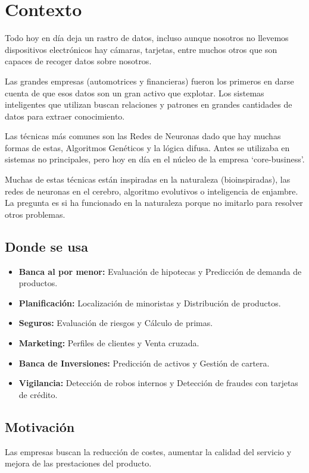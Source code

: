 \documentclass[12pt, twoside, openright]{report} %
\begin{document}
\section{Contexto}
Todo hoy en día deja un rastro de datos, incluso aunque nosotros no llevemos dispositivos electrónicos hay cámaras, tarjetas, entre muchos otros que son capaces de recoger datos sobre nosotros.

Las grandes empresas (automotrices y financieras) fueron los primeros en darse cuenta de que esos datos son un gran activo que explotar. Los sistemas inteligentes que utilizan buscan relaciones y patrones en grandes cantidades de datos para extraer conocimiento.

Las técnicas más comunes son las Redes de Neuronas dado que hay muchas formas de estas, Algoritmos Genéticos y la lógica difusa. Antes se utilizaba en sistemas no principales, pero hoy en día en el núcleo de la empresa ‘core-business’.

Muchas de estas técnicas están inspiradas en la naturaleza (bioinspiradas), las redes de neuronas en el cerebro, algoritmo evolutivos o inteligencia de enjambre. La pregunta es si ha funcionado en la naturaleza porque no imitarlo para resolver otros problemas.

\subsection{Donde se usa}
\begin{itemize}
	\item \textbf{Banca al por menor:} Evaluación de hipotecas y Predicción de demanda de productos.
	\item \textbf{Planificación:} Localización de minoristas y Distribución de productos.
	\item \textbf{Seguros:} Evaluación de riesgos y Cálculo de primas.
	\item \textbf{Marketing:} Perfiles de clientes y Venta cruzada.
	\item \textbf{Banca de Inversiones:} Predicción de activos y Gestión de cartera.
	\item \textbf{Vigilancia:} Detección de robos internos y Detección de fraudes con tarjetas de crédito.
\end{itemize}

\subsection{Motivación}
Las empresas buscan la reducción de costes, aumentar la calidad del servicio y mejora de las prestaciones del producto.
\end{document}
